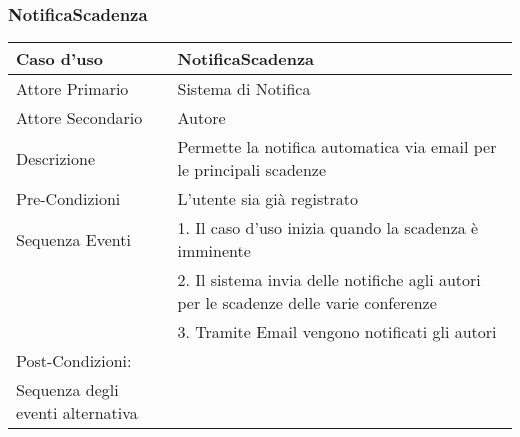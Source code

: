 \subsubsection{NotificaScadenza}
\begin{tabular}{|p{1cm}|p{10cm}}
\hline 
\rowcolor{Skyblue}
Caso d'uso & NotificaScadenza \\
\hline
Attore Primario & Sistema di Notifica\\
\hline
Attore Secondario & Autore\\
\hline
Descrizione & Permette la notifica automatica via email per le principali scadenze\\
\hline
Pre-Condizioni& L'utente sia già registrato\\
\hline
Sequenza Eventi&1.  Il caso d'uso inizia quando la scadenza è imminente\\
& 2. Il sistema invia delle notifiche agli autori per le scadenze delle varie conferenze \\ 
&3. Tramite Email vengono notificati gli autori\\

\hline
Post-Condizioni: & \\
\hline
Sequenza degli eventi alternativa & \\
\hline
\end{tabular}